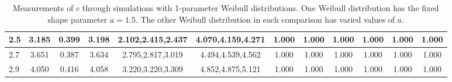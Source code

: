 \begin{table*}[h!]
\begin{center}
\begin{tabular}{| l | c | c | c | c | c | c | c | c | c | c | c |}
2.5 & 3.185 & 0.399 & 3.198 & 2.102,2.415,2.437 & 4.070,4.159,4.271  & 1.000  & 1.000  & 1.000  & 1.000  & 1.000  & 1.000 \\\hline
2.7 & 3.651 & 0.387 & 3.634 & 2.795,2.817,3.019 & 4.494,4.539,4.562  & 1.000  & 1.000  & 1.000  & 1.000  & 1.000  & 1.000 \\\hline
2.9 & 4.050 & 0.416 & 4.058 & 3.220,3.220,3.309 & 4.852,4.875,5.121  & 1.000  & 1.000  & 1.000  & 1.000  & 1.000  & 1.000 \\\hline
\end{tabular}
\caption{Measurements of $c$ through simulations
        with 1-parameter Weibull distributions.
        One Weibull distribution has the fixed shape parameter $a=1.5$.
        The other Weibull distribution in each comparison
        has varied values of $a$.}
\end{center}
\end{table*}